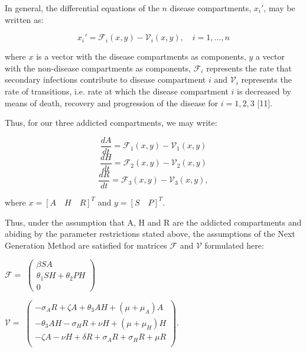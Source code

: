 \documentclass[12pt]{article}
\begin{document}
In general, the differential equations of the $n$ disease compartments, $x_i'$, may be written as: 

\[{x_i'} = \mathscr{F}_{i} (x,y)-\mathscr{V}_i (x,y),\quad i=1,...,n\] 

where $x$ is a vector with the disease compartments as components, $y$ a vector with the non-disease compartments as components, $\mathscr{F}_{i}$ represents the rate that secondary infections contribute to disease compartment $i$ and $\mathscr{V}_{i}$ represents the rate of transitions, i.e. rate at which the disease compartment $i$ is decreased by means of death, recovery and progression of the disease for $i=1,2,3$ [11]. 

Thus, for our three addicted compartments, we may write: 

$$\dfrac{dA}{dt} = \mathscr{F}_{1} (x,y)-\mathscr{V}_{1}(x,y)$$
$$\dfrac{dH}{dt} = \mathscr{F}_{2} (x,y)-\mathscr{V}_{2}(x,y)$$
$$\dfrac{dR}{dt} = \mathscr{F}_{3} (x,y)-\mathscr{V}_{3}(x,y),$$

where $x= {[A\quad H\quad R]}^{T}$ and $y= {[S\quad P]}^{T}$.



Thus, under the assumption that A, H and R are the addicted compartments and abiding by the parameter restrictions stated above, the assumptions of the Next Generation Method are satisfied for matrices $\mathscr{F}$ and $\mathscr{V}$ formulated here:

\begin{center}
$\mathscr{F}=$
$ \begin{pmatrix}

\beta SA \\
\theta_{1}SH+\theta_{2}PH \\
0
\end{pmatrix}$



$\mathscr{V}=$
$ \begin{pmatrix}

-\sigma_{A}R+\zeta A+\theta_{3} AH + (\mu +\mu_{A})A \\
-\theta_{3}AH-\sigma_{H}R+\nu H +(\mu +\mu_{H}) H \\
-\zeta A -\nu H +\delta R +\sigma_{A}R +\sigma_{H}R +\mu R\\
\end{pmatrix}$.
\end{center}
\end{document}
